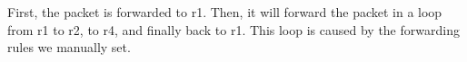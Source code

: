 
First, the packet is forwarded to r1. Then, it will forward the packet in a loop from r1 to r2, to r4, and finally back to r1. This loop is caused by the forwarding rules we manually set.